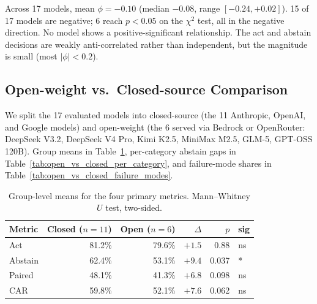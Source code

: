 Across 17 models, mean $\phi = -0.10$ (median $-0.08$, range $[-0.24, +0.02]$). 15 of 17 models are negative; 6 reach $p<0.05$ on the $\chi^2$ test, all in the negative direction. No model shows a positive-significant relationship. The act and abstain decisions are weakly anti-correlated rather than independent, but the magnitude is small (most $|\phi| < 0.2$).

\subsection{Open-weight vs.\ Closed-source Comparison}
\label{app:open_vs_closed}

We split the 17 evaluated models into closed-source (the 11 Anthropic, OpenAI, and Google models) and open-weight (the 6 served via Bedrock or OpenRouter: DeepSeek V3.2, DeepSeek V4 Pro, Kimi K2.5, MiniMax M2.5, GLM-5, GPT-OSS 120B). Group means in Table~\ref{tab:open_vs_closed_summary}, per-category abstain gaps in Table~\ref{tab:open_vs_closed_per_category}, and failure-mode shares in Table~\ref{tab:open_vs_closed_failure_modes}.

\begin{table}[h]
\centering
\small
\caption{Group-level means for the four primary metrics. Mann--Whitney $U$ test, two-sided.}
\label{tab:open_vs_closed_summary}
\begin{tabular}{lrrrrl}
\toprule
Metric & Closed ($n{=}11$) & Open ($n{=}6$) & $\Delta$ & $p$ & sig \\
\midrule
Act           & 81.2\% & 79.6\% & $+1.5$ & 0.88  & ns \\
Abstain       & 62.4\% & 53.1\% & $+9.4$ & 0.037 & * \\
Paired        & 48.1\% & 41.3\% & $+6.8$ & 0.098 & ns \\
CAR           & 59.8\% & 52.1\% & $+7.6$ & 0.062 & ns \\
\bottomrule
\end{tabular}
\end{table}

